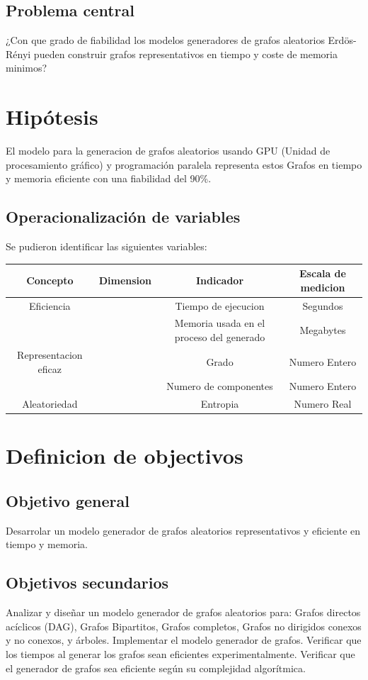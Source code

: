 \documentclass[11pt]{extarticle}
\begin{document}
  \subsection{Problema central}
     ¿Con que grado de fiabilidad los modelos generadores de grafos aleatorios Erdös-Rényi pueden construir grafos representativos en tiempo y coste de memoria minimos? 

\section{Hip\'otesis}
  El modelo para la generacion de grafos aleatorios usando GPU (Unidad de procesamiento gr\'afico) y programaci\'on paralela 
  representa estos Grafos en tiempo y memoria eficiente con una fiabilidad del 90\%.

  \subsection{Operacionalizaci\'on de variables}
  Se pudieron identificar las siguientes variables:\hfill \break \break
  \begin{tabular}{||c c c c||}
    \hline
    Concepto & Dimension & Indicador & Escala de medicion\\
    \hline
    Eficiencia &  & Tiempo de ejecucion & Segundos\\
              &   & Memoria usada en el proceso del generado & Megabytes\\
    \hline
    Representacion eficaz & & Grado  &  Numero Entero\\ 
              &   & Numero de componentes & Numero Entero\\
    \hline
    Aleatoriedad & & Entropia  & Numero Real\\
    \hline
  \end{tabular}

\section{Definicion de objectivos}
  \subsection{Objetivo general}
  Desarrolar un modelo generador de grafos aleatorios representativos y eficiente en tiempo y memoria.
  \subsection{Objetivos secundarios}
      \begin{itemize}
        \guion Analizar y diseñar un modelo generador de grafos aleatorios para: Grafos directos acíclicos (DAG), Grafos Bipartitos, Grafos completos, Grafos no dirigidos conexos y no conexos, y árboles.
        \guion Implementar el modelo generador de grafos.
        \guion Verificar que los tiempos al generar los grafos sean eficientes experimentalmente.
        \guion Verificar que el generador de grafos sea eficiente según su complejidad algorítmica.
      \end{itemize}
\end{document}
